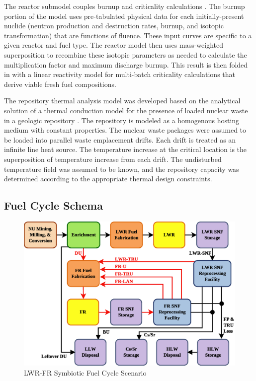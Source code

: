 The reactor submodel couples burnup and criticality calculations \cite{Scopatz2009}. The burnup portion of the
model uses pre-tabulated physical data for each initially-present nuclide (neutron production and destruction
rates, burnup, and isotopic transformation) that are functions of fluence. These input curves are specific to a
given reactor and fuel type. The reactor model then uses mass-weighted superposition to recombine these
isotopic parameters as needed to calculate the multiplication factor and maximum discharge burnup. This result is
then folded in with a linear reactivity model for multi-batch criticality calculations that derive viable
fresh fuel compositions.

The repository thermal analysis model was developed based on the
analytical solution of a thermal conduction model for the presence of
loaded nuclear waste in a geologic repository \cite{Li2010a}. The
repository is modeled as a homogenous hosting medium with constant
properties. The nuclear waste packages were assumed to be loaded into parallel
waste emplacement drifts. Each drift is treated as
an infinite line heat source. The temperature increase at the critical
location is the superposition of temperature increase from each drift. The
undisturbed temperature field was assumed to be known, and the repository
capacity was determined according to the appropriate thermal design
constraints.



\subsection{Fuel Cycle Schema}
\label{cts_sec:fcschema}

\begin{figure}[htbp]
\begin{center}
\includegraphics[scale=0.50]{figs/LWR_FR.eps}
\caption{LWR-FR Symbiotic Fuel Cycle Scenario}
\label{lwr_fr_fc}
\end{center}
\end{figure}

